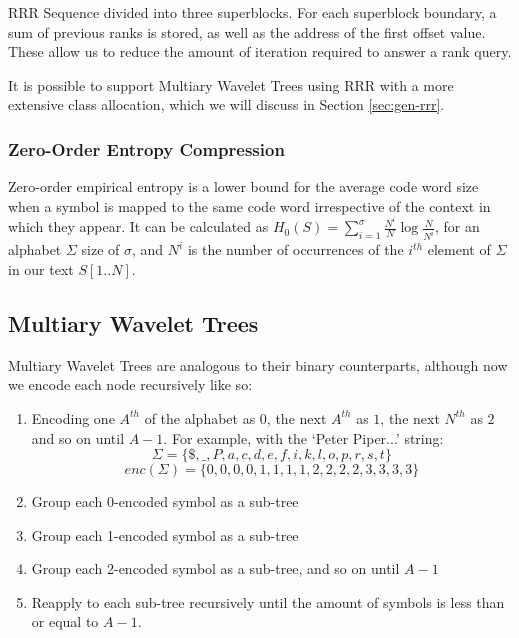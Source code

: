 		{RRR Sequence divided into three superblocks. For each superblock
		boundary, a sum of previous ranks is stored, as well as the address
		of the first offset value. These allow us to reduce the amount of 
		iteration required to answer a rank query.}

It is possible to support Multiary Wavelet Trees using RRR with a more extensive 
class allocation, which we will discuss in Section \ref{sec:gen-rrr}.

\subsubsection{Zero-Order Entropy Compression}
\label{sec:entropy}
Zero-order empirical entropy is a lower bound for the average code word size
when a symbol is mapped to the same code word irrespective of the context in
which they appear. It can be calculated as $H_0(S) = \sum_{i = 1}^{\sigma}
\frac{N^i}{N} \log \frac{N}{N^i}$, for an alphabet $\Sigma$ size of $\sigma$, 
and $N^i$ is the number of occurrences of the $i^{th}$ element of $\Sigma$ in 
our text $S[1..N]$.


\clearpage
\subsection{Multiary Wavelet Trees}
Multiary Wavelet Trees are analogous to their binary counterparts, although now 
we encode each node recursively like so:

\begin{enumerate}
    \item Encoding one $A^{th}$ of the alphabet as $0$, the next $A^{th}$ as 
		$1$, the next $N^{th}$ as $2$ and so on until $A-1$. For example, with 
		the `Peter Piper...' string:
		$$\Sigma = \{ \$, \_, P, a, c, d, e, f, i, k, l, o, p, r, s, t \}$$
	   	$$enc(\Sigma) = \{  0,  0, 0, 0, 1, 1, 1, 1, 2, 2, 2, 2, 3, 3, 3, 3 \}$$
    \item Group each 0-encoded symbol as a sub-tree
    \item Group each 1-encoded symbol as a sub-tree
    \item Group each 2-encoded symbol as a sub-tree, and so on until $A-1$
    \item Reapply to each sub-tree recursively until the amount of symbols is
	less than or equal to $A - 1$.
\end{enumerate}

